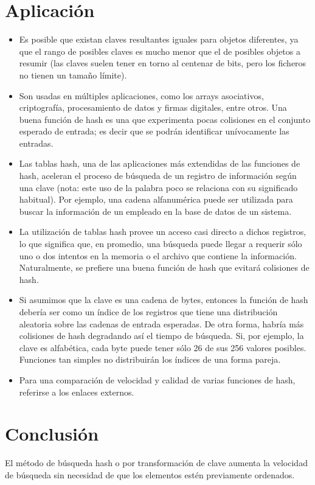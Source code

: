 \documentclass[letterpaper,openright,12pt]{report}
\begin{document}
\section{Aplicación}

\begin{itemize}
\itemsep1pt\parskip0pt
\item
  Es posible que existan claves resultantes iguales para objetos
  diferentes, ya que el rango de posibles claves es mucho menor que el
  de posibles objetos a resumir (las claves suelen tener en torno al
  centenar de bits, pero los ficheros no tienen un tamaño límite).
\item
  Son usadas en múltiples aplicaciones, como los arrays asociativos,
  criptografía, procesamiento de datos y firmas digitales, entre otros.
  Una buena función de hash es una que experimenta pocas colisiones en
  el conjunto esperado de entrada; es decir que se podrán identificar
  unívocamente las entradas.
\item
  Las tablas hash, una de las aplicaciones más extendidas de las
  funciones de hash, aceleran el proceso de búsqueda de un registro de
  información según una clave (nota: este uso de la palabra poco se
  relaciona con su significado habitual). Por ejemplo, una cadena
  alfanumérica puede ser utilizada para buscar la información de un
  empleado en la base de datos de un sistema.
\item
  La utilización de tablas hash provee un acceso casi directo a dichos
  registros, lo que significa que, en promedio, una búsqueda puede
  llegar a requerir sólo uno o dos intentos en la memoria o el archivo
  que contiene la información. Naturalmente, se prefiere una buena
  función de hash que evitará colisiones de hash.
\item
  Si asumimos que la clave es una cadena de bytes, entonces la función
  de hash debería ser como un índice de los registros que tiene una
  distribución aleatoria sobre las cadenas de entrada esperadas. De otra
  forma, habría más colisiones de hash degradando así el tiempo de
  búsqueda. Si, por ejemplo, la clave es alfabética, cada byte puede
  tener sólo 26 de sus 256 valores posibles. Funciones tan simples no
  distribuirán los índices de una forma pareja.
\item
  Para una comparación de velocidad y calidad de varias funciones de
  hash, referirse a los enlaces externos.
\end{itemize}
\newpage
\section{Conclusión}

El método de búsqueda hash o por transformación de clave aumenta la
velocidad de búsqueda sin necesidad de que los elementos estén
previamente ordenados.
\end{document}
